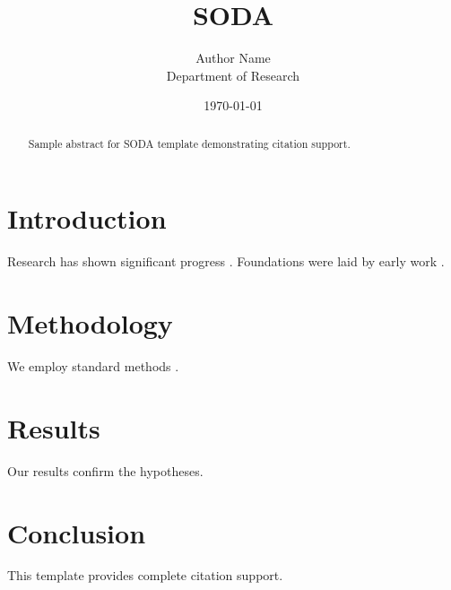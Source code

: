 \documentclass{article}
\title{SODA}
\author{Author Name \\ \small Department of Research}
\date{\today}
\begin{document}
\maketitle

\begin{abstract}
Sample abstract for SODA template demonstrating citation support.
\end{abstract}

\section{Introduction}
Research has shown significant progress \citep{einstein1905}. Foundations were laid by early work \citep{turing1950}.

\section{Methodology}
We employ standard methods \citep{knuth1984}.

\section{Results}
Our results confirm the hypotheses.

\section{Conclusion}
This template provides complete citation support.



\end{document}
